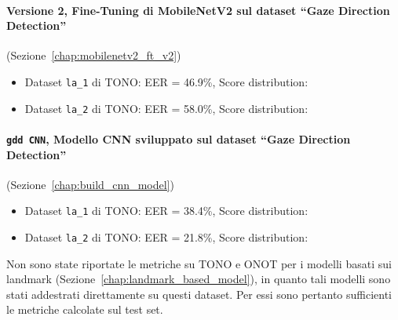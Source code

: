 \documentclass[12pt,a4paper,openright,twoside]{book}
\begin{document}
\paragraph{Versione 2, Fine-Tuning di MobileNetV2 sul dataset ``Gaze Direction Detection''} (Sezione~\ref{chap:mobilenetv2_ft_v2})
\begin{itemize}
    \item Dataset \texttt{la\_1} di TONO:  
    EER = 46.9\%, Score distribution: 
    \item Dataset \texttt{la\_2} di TONO:  
    EER = 58.0\%, Score distribution: 
\end{itemize}

\paragraph{\texttt{gdd CNN}, Modello CNN sviluppato sul dataset ``Gaze Direction Detection''} (Sezione~\ref{chap:build_cnn_model})
\begin{itemize}
    \item Dataset \texttt{la\_1} di TONO:  
    EER = 38.4\%, Score distribution: 
    \item Dataset \texttt{la\_2} di TONO:  
    EER = 21.8\%, Score distribution: 
\end{itemize}

\medskip
Non sono state riportate le metriche su TONO e ONOT per i modelli basati sui landmark (Sezione~\ref{chap:landmark_based_model}), in quanto tali modelli sono stati addestrati direttamente su questi dataset. Per essi sono pertanto sufficienti le metriche calcolate sul test set.
\end{document}
